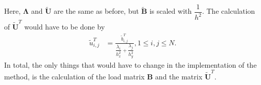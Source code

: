 Here, $\mathbf{\Lambda}$ and $\mathbf{\widetilde{U}}$ are the same as before, but $\mathbf{\widetilde{B}}$ is scaled with $\dfrac{1}{h^2}$. The calculation of $\mathbf{\widetilde{U}}^T$ would have to be done by
\begin{align*}
	\tilde{u}^T_{i,j} &= \frac{\tilde{b}^T_{i,j}}{\dfrac{\lambda_i}{h_x^2} + \dfrac{\lambda_j}{h_y^2}}, 1 \leq i, j \leq N.
\end{align*}
In total, the only things that would have to change in the implementation of the method, is the calculation of the load matrix $\mathbf{B}$ and the matrix $\mathbf{\widetilde{U}}^T$.
